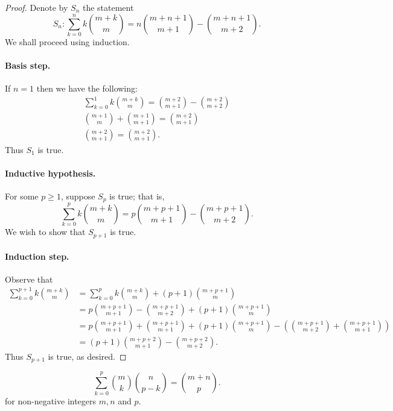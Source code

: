 \documentclass{exam}
\newcommand{\paren}[1]{\left(#1\right)}
\begin{document}
\begin{proof}
    Denote by $S_n$ the statement $$S_n:\sum_{k=0}^nk\binom{m+k}m=n\binom{m+n+1}{m+1}-\binom{m+n+1}{m+2}.$$ We shall proceed using induction.

    \paragraph{Basis step.} If $n=1$ then we have the following:
    \begin{align*}
        \sum_{k=0}^1k\binom{m+k}m=\binom{m+2}{m+1}-\binom{m+2}{m+2}\\
        \binom{m+1}m+\binom{m+1}{m+1} = \binom{m+2}{m+1}\\
        \binom{m+2}{m+1}=\binom{m+2}{m+1}.
    \end{align*}
    Thus $S_1$ is true.

    \paragraph{Inductive hypothesis.} For some $p\ge 1$, suppose $S_p$ is true; that is, $$\sum_{k=0}^pk\binom{m+k}m=p\binom{m+p+1}{m+1}-\binom{m+p+1}{m+2}.$$ We wish to show that $S_{p+1}$ is true.

    \paragraph{Induction step.} Observe that
    \begin{align*}
        \sum_{k=0}^{p+1}k\binom{m+k}m&=\sum_{k=0}^pk\binom{m+k}m + (p+1)\binom{m+p+1}m\\
        &=p\binom{m+p+1}{m+1}-\binom{m+p+1}{m+2} +(p+1)\binom{m+p+1}{m}\\
        &=p\binom{m+p+1}{m+1} + \binom{m+p+1}{m+1}+(p+1)\binom{m+p+1}m - \paren{\binom{m+p+1}{m+2} + \binom{m+p+1}{m+1}}\\
        &=(p+1)\binom{m+p+2}{m+1}-\binom{m+p+2}{m+2}.
    \end{align*}
    Thus $S_{p+1}$ is true, as desired.
\end{proof}

\begin{proposition}{10.38}
    $$\sum_{k=0}^p\binom m k\binom{n}{p-k}=\binom{m+n}p.$$ for non-negative integers $m,n$ and $p$.
\end{proposition}
\end{document}
